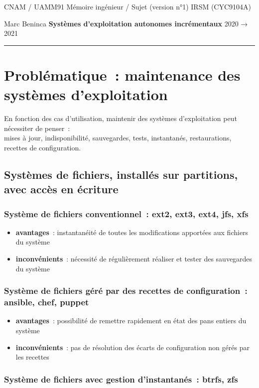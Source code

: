 \documentclass[10pt]{article}
\newcommand{\hr}{\rule{\textwidth}{1pt}}
\newenvironment{itmz}{\begin{itemize}
\setlength{\itemsep}{0em}
}{\end{itemize}}
\begin{document}
CNAM / UAMM91 \hfill Mémoire ingénieur / Sujet (version n°1) \hfill IRSM (CYC9104A)

Marc Beninca \hfill \textbf{Systèmes d’exploitation autonomes incrémentaux} \hfill 2020 → 2021

\hr

\section{Problématique : maintenance des systèmes d’exploitation}

En fonction des cas d’utilisation, maintenir des systèmes d’exploitation peut nécessiter de penser :\\
mises à jour, indisponibilité, sauvegardes, tests, instantanés, restaurations, recettes de configuration.

\subsection{Systèmes de fichiers, installés sur partitions, avec accès en écriture}

\subsubsection{Système de fichiers conventionnel : ext2, ext3, ext4, jfs, xfs}

\begin{itmz}
\item{\textbf{avantages} : instantanéité de toutes les modifications apportées aux fichiers du système}
\item{\textbf{inconvénients} : nécessité de régulièrement réaliser et tester des sauvegardes du système}
\end{itmz}

\subsubsection{Système de fichiers géré par des recettes de configuration : ansible, chef, puppet}

\begin{itmz}
\item{\textbf{avantages} : possibilité de remettre rapidement en état des pans entiers du système}
\item{\textbf{inconvénients} : pas de résolution des écarts de configuration non gérés par les recettes}
\end{itmz}

\subsubsection{Système de fichiers avec gestion d’instantanés : btrfs, zfs}
\end{document}
